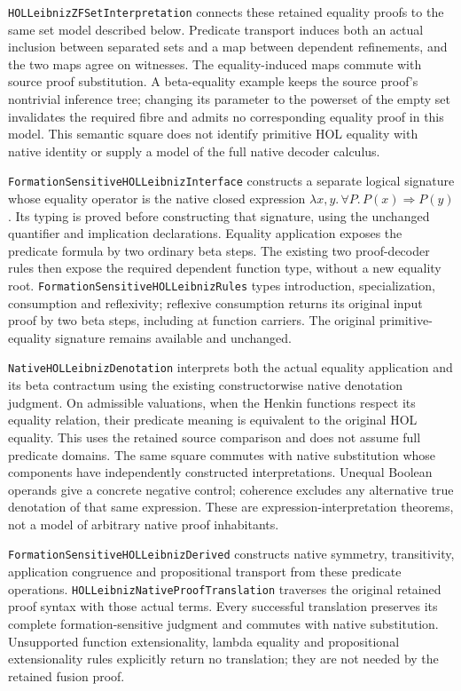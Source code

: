 \documentclass[11pt]{article}
\theoremstyle{definition}
\theoremstyle{remark}
\begin{document}
\nolinkurl{HOLLeibnizZFSetInterpretation} connects these retained equality
proofs to the same set model described below. Predicate transport induces
both an actual inclusion between separated sets and a map between dependent
refinements, and the two maps agree on witnesses. The equality-induced
maps commute with source proof substitution. A beta-equality example keeps
the source proof's nontrivial inference tree; changing its parameter to the
powerset of the empty set invalidates the required fibre and admits no
corresponding equality proof in this model. This semantic square does not
identify primitive HOL equality with native identity or supply a model of
the full native decoder calculus.

\nolinkurl{FormationSensitiveHOLLeibnizInterface} constructs a separate
logical signature whose equality operator is the native closed expression
\(\lambda x,y.\,\forall P.\,P(x)\Rightarrow P(y)\). Its typing is
proved before constructing that signature, using the unchanged quantifier
and implication declarations. Equality application exposes the predicate
formula by two ordinary beta steps. The existing two proof-decoder rules
then expose the required dependent function type, without a new equality
root. \nolinkurl{FormationSensitiveHOLLeibnizRules} types introduction,
specialization, consumption and reflexivity; reflexive consumption returns
its original input proof by two beta steps, including at function carriers.
The original primitive-equality signature remains available and unchanged.

\nolinkurl{NativeHOLLeibnizDenotation} interprets both the actual equality
application and its beta contractum using the existing constructorwise
native denotation judgment. On admissible valuations, when the Henkin
functions respect its equality relation, their predicate meaning is
equivalent to the original HOL equality. This uses the retained source
comparison and does not assume full predicate domains. The same square
commutes with native substitution whose components have independently
constructed interpretations. Unequal Boolean operands give a concrete
negative control; coherence excludes any alternative true denotation of
that same expression. These are expression-interpretation theorems, not
a model of arbitrary native proof inhabitants.

\nolinkurl{FormationSensitiveHOLLeibnizDerived} constructs native symmetry,
transitivity, application congruence and propositional transport from these
predicate operations. \nolinkurl{HOLLeibnizNativeProofTranslation} traverses
the original retained proof syntax with those actual terms. Every successful
translation preserves its complete formation-sensitive judgment and
commutes with native substitution. Unsupported function extensionality,
lambda equality and propositional extensionality rules explicitly return
no translation; they are not needed by the retained fusion proof.
\end{document}
